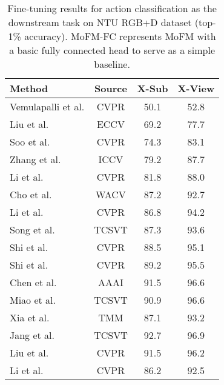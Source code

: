 \begin{table}[htbp]
    \centering
    \caption{Fine-tuning results for action classification as the downstream task on NTU RGB+D \cite{ntu60Paper} dataset (top-1\% accuracy). MoFM-FC represents MoFM with a basic fully connected head to serve as a simple baseline.}
    \label{tab:ntu_60}
    \begin{tabular}{lccc}
        \toprule
        \toprule
        \textbf{Method} & \textbf{Source} & \textbf{X-Sub} & \textbf{X-View} \\
        \midrule
        Vemulapalli et al. \cite{vemulapalli2014human} & CVPR & 50.1 & 52.8 \\
        Liu et al. \cite{liu2016spatio} & ECCV & 69.2 & 77.7 \\
        Soo et al. \cite{soo2017interpretable} & CVPR & 74.3 & 83.1 \\
        Zhang et al. \cite{zhang2017view} & ICCV & 79.2 & 87.7 \\
        Li et al. \cite{li2018independently} & CVPR & 81.8 & 88.0 \\
        Cho et al. \cite{cho2020self} & WACV & 87.2 & 92.7 \\
        Li et al. \cite{li2019actional} & CVPR & 86.8 & 94.2 \\
        Song et al. \cite{song2020richly} & TCSVT & 87.3 & 93.6 \\
        Shi et al. \cite{shi2019two} & CVPR & 88.5 & 95.1 \\
        Shi et al. \cite{shi2019skeleton} & CVPR & 89.2 & 95.5 \\
        Chen et al. \cite{chen2021multi} & AAAI & 91.5 & 96.6 \\
        Miao et al. \cite{miao2021central} & TCSVT & 90.9 & 96.6 \\
        Xia et al. \cite{xia2021laga} & TMM & 87.1 & 93.2 \\
        Jang et al. \cite{jang2024multi} & TCSVT & 92.7 & 96.9 \\
        Liu et al. \cite{9156556} & CVPR & 91.5 & 96.2 \\
        Li et al. \cite{9577939} & CVPR & 86.2 & 92.5 \\

\end{tabular}
\end{table}
